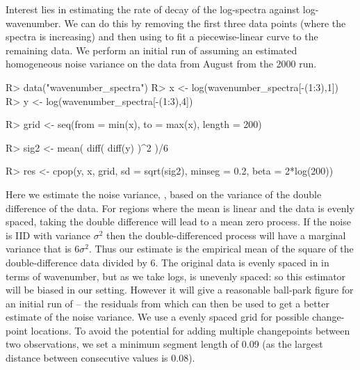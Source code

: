 \documentclass[nojss]{jss}
\begin{document}
Interest lies in estimating the rate of decay of the log-spectra against log-wavenumber. We can do this by removing the first three data points (where the spectra is increasing) and then using  to fit a piecewise-linear curve to the remaining data. We perform an initial run of  assuming an estimated homogeneous noise variance on the data from August from the 2000 run.
\begin{CodeChunk}
\begin{CodeInput}
R> data("wavenumber_spectra")
R> x <- log(wavenumber_spectra[-(1:3),1])
R> y <- log(wavenumber_spectra[-(1:3),4])

R> grid <- seq(from = min(x), to = max(x), length = 200)

R> sig2 <- mean( diff( diff(y) )^2 )/6 

R> res <- cpop(y, x, grid, sd = sqrt(sig2), minseg = 0.2, beta = 2*log(200))
\end{CodeInput}
\end{CodeChunk}
Here we estimate the noise variance, , based on the variance of the double difference of the data. For regions where the mean is linear and the data is evenly spaced, taking the double difference will lead to a mean zero process. If the noise is IID with variance $\sigma^2$ then the double-differenced process will have a marginal variance that is $6\sigma^2$. Thus our estimate is the empirical mean of the square of the double-difference data divided by 6. The original data is evenly spaced in in terms of wavenumber, but as we take logs,  is unevenly spaced: so this estimator will be biased in our setting. However it will give a reasonable ball-park figure for an initial run of  -- the residuals from which can then be used to get a better estimate of the noise variance. We use a evenly spaced grid for possible change-point locations. To avoid the potential for adding multiple changepoints between two observations, we set a minimum segment length of 0.09 (as the largest distance between consecutive  values is 0.08).
\end{document}
